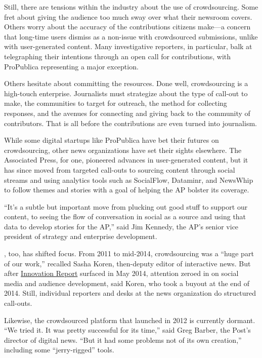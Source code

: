 \begin{itemize}
\begin{itemize}
Still, there are tensions within the industry about the use of crowdsourcing. Some fret about giving the audience too much sway over what their newsroom covers. Others worry about the accuracy of the contributions citizens make---a concern that long-time users dismiss as a non-issue with crowdsourced submissions, unlike with user-generated content. Many investigative reporters, in particular, balk at telegraphing their intentions through an open call for contributions, with ProPublica representing a major exception.

Others hesitate about committing the resources. Done well, crowdsourcing is a high-touch enterprise. Journalists must strategize about the type of call-out to make, the communities to target for outreach, the method for collecting responses, and the avenues for connecting and giving back to the community of contributors. That is all before the contributions are even turned into journalism.  

While some digital startups like ProPublica have bet their futures on crowdsourcing, other news organizations have set their sights elsewhere. The Associated Press, for one, pioneered advances in user-generated content, but it has since moved from targeted call-outs to sourcing content through social streams and using analytics tools such as SocialFlow, Dataminr, and NewsWhip to follow themes and stories with a goal of helping the AP bolster its coverage. 

``It’s a subtle but important move from plucking out good stuff to support our content, to seeing the flow of conversation in social as a source and using that data to develop stories for the AP,'' said Jim Kennedy, the AP’s senior vice president of strategy and enterprise development.\autocite{Kennedy}

, too, has shifted focus. From 2011 to mid-2014, crowdsourcing was a “huge part of our work,” recalled Sasha Koren, then-deputy editor of interactive news. But after  \href{http://mashable.com/2014/05/16/full-new-york-times-innovation-report/#fLsAGSD30Oq4}{Innovation Report}\autocite{Innovation} surfaced in May 2014, attention zeroed in on social media and audience development, said Koren, who took a buyout at the end of 2014. Still, individual reporters and desks at the news organization do structured call-outs.

Likewise, the crowdsourced platform that  launched in 2012 is currently dormant. ``We tried it. It was pretty successful for its time,'' said Greg Barber, the Post’s director of digital news. ``But it had some problems not of its own creation,'' including some ``jerry-rigged'' tools.\autocite{Barber}
 

\end{itemize}
\end{itemize}
